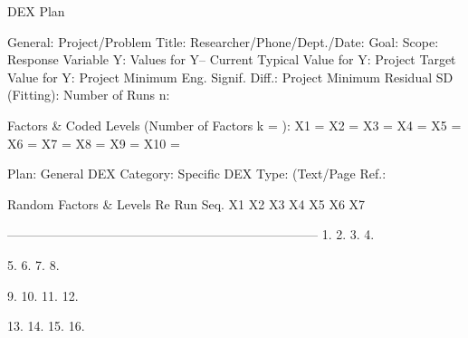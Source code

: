                                                       DEX Plan
 
 
General:
      Project/Problem Title:
      Researcher/Phone/Dept./Date:
      Goal:
      Scope:
      Response Variable Y:
      Values for Y--
            Current Typical Value for Y:
            Project Target Value for Y:
            Project Minimum Eng. Signif. Diff.:
            Project Minimum Residual SD (Fitting):
      Number of Runs n:
 
Factors & Coded Levels  (Number of Factors k =          ):
      X1 =
      X2 =
      X3 =
      X4 =
      X5 =
      X6 =
      X7 =
      X8 =
      X9 =
     X10 =
 
 
Plan:
      General DEX Category:
      Specific DEX Type:                       (Text/Page Ref.:
 
                  Random                 Factors & Levels                     Re
                 Run Seq.   X1    X2    X3    X4    X5    X6    X7
 
      --------------------------------------------------------------------------
           1.
           2.
           3.
           4.
 
           5.
           6.
           7.
           8.
 
           9.
         10.
         11.
         12.
 
         13.
         14.
         15.
         16.
